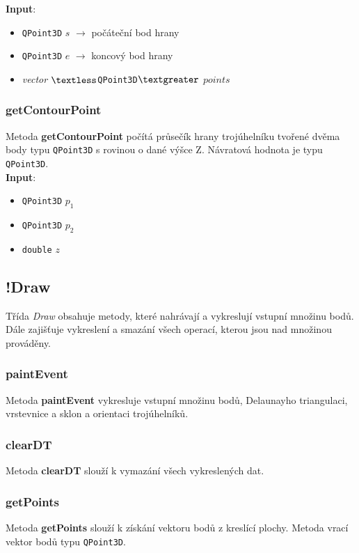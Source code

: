 \documentclass[a4paper, 12pt]{article}
\begin{document}
\textbf{Input}:
\begin{itemize}
\item \texttt{QPoint3D} $s$ $\rightarrow$ počáteční bod hrany
\item \texttt{QPoint3D} $e$ $\rightarrow$ koncový bod hrany
\item \textsl{vector} $\textless$\texttt{QPoint3D}$\textgreater$ $points$
\end{itemize}

\subsubsection*{getContourPoint}
Metoda \textbf{getContourPoint} počítá průsečík hrany trojúhelníku tvořené dvěma body typu \texttt{QPoint3D} s rovinou o dané výšce Z. Návratová hodnota je typu \texttt{QPoint3D}.\\

\textbf{Input}:
\begin{itemize}
\item \texttt{QPoint3D} $p_1$ 
\item \texttt{QPoint3D} $p_2$ 
\item \texttt{double} $z$ 
\end{itemize}

\subsection{!Draw}
Třída \textit{Draw} obsahuje metody, které nahrávají a vykreslují vstupní množinu bodů. Dále zajišťuje vykreslení a smazání všech operací, kterou jsou nad množinou prováděny.

\subsubsection*{paintEvent}
Metoda \textbf{paintEvent} vykresluje vstupní množinu bodů, Delaunayho triangulaci, vrstevnice a sklon a orientaci trojúhelníků.

\subsubsection*{clearDT}
Metoda \textbf{clearDT} slouží k vymazání všech vykreslených dat.

\subsubsection*{getPoints}
Metoda \textbf{getPoints} slouží k získání vektoru bodů z kreslící plochy. Metoda vrací vektor bodů typu \texttt{QPoint3D}.
\end{document}
